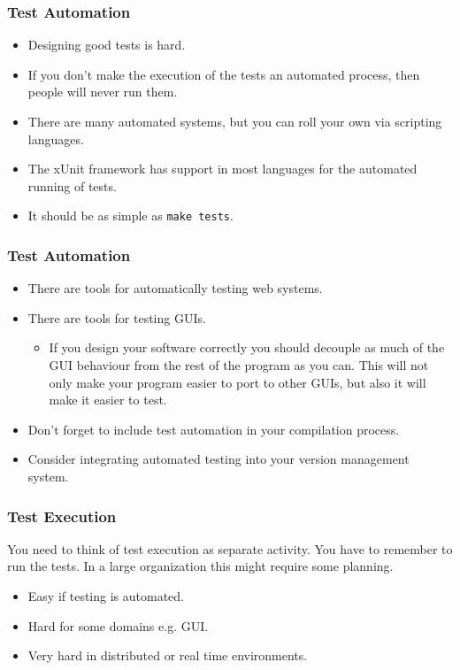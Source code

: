 \documentclass[handout]{beamer}
\begin{document}
\begin{frame}  
  \frametitle{Test Automation}
  \begin{itemize}
  \item Designing good tests is hard.
  \item If you don't make the execution of the tests an automated process, then
    people will never run them.
  \item There are many automated systems, but you can roll your own
    via scripting languages.   
  \item The xUnit framework has support in most languages for the
    automated running of tests. 
  \item It should be as simple as {\tt make tests}.
  \end{itemize}
\end{frame}
\begin{frame}
  \frametitle{Test Automation}
  \begin{itemize}
  \item There are tools for automatically testing web systems.
  \item There are tools for testing GUIs.
    \begin{itemize}
    \item If you design your software correctly you should decouple as
      much of the GUI behaviour from the rest of the program as you
      can. This will not only make your program easier to port to
      other GUIs, but also it will make it easier to test.
    \end{itemize}
  \item Don't forget to include test automation in your compilation
    process.
  \item Consider integrating automated testing into your version
    management system.  
  \end{itemize}
\end{frame}
\begin{frame}
  \frametitle{Test Execution}
You need to think of test execution as separate activity. You have to
remember to run the tests. In a large organization this might require
some planning.    
  \begin{itemize}
  \item Easy if testing is automated.
  \item Hard for some domains e.g. GUI.
  \item Very hard in distributed or real time environments.
  \end{itemize}
\end{frame}
\end{document}
